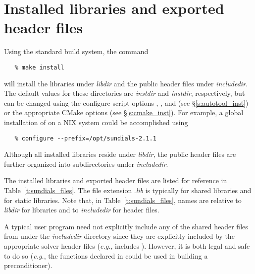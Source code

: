 \section{Installed libraries and exported header files}

Using the standard {\sundials} build system, the command
\begin{verbatim}
   % make install
\end{verbatim}
will install the libraries under {\em libdir} and the public header
files under {\em includedir}. The default values for these directories are
{\em instdir} and {\em instdir},
respectively, but can be changed using the configure script options
, ,  and  
(see \S\ref{s:autotool_inst}) or the appropriate CMake options
(see \S\ref{s:cmake_inst}). For example, a global installation
of {\sundials} on a {\sc *NIX} system could be accomplished using
\begin{verbatim}
   % configure --prefix=/opt/sundials-2.1.1
\end{verbatim}
Although all installed libraries reside under {\em libdir}, the public header files
are further organized into subdirectories under {\em includedir}.

The installed libraries and exported header files are listed for
reference in Table~\ref{t:sundials_files}.  The file extension .{\em lib}
is typically  for shared libraries and  for static libraries.
Note that, in Table~\ref{t:sundials_files}, names are relative to {\em libdir}
for libraries and to {\em includedir} for header files.

A typical user program need not explicitly include any of the shared
{\sundials} header files from under the {\em includedir}
directory since they are explicitly included by the appropriate solver
header files ({\em e.g.},  includes
). However, it is both legal and safe to do so
({\em e.g.}, the functions declared in  
could be used in building a preconditioner).

